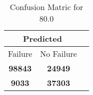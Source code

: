 \begin{table}[] 
\label{Table: Prediction Accuracy-DMD80.0OnlySunEKF-combinationReflection-Reflection} 
\caption{Confusion Matric for 80.0} 
\centering 
\begin{tabular} 
 {@{}ccc@{}} 
\toprule 
\multicolumn{2}{c}{\textbf{Predicted}}
 \\ \midrule 
\multicolumn{1}{|c|}{Failure} & 
\multicolumn{1}{c|}{No Failure}
 \\ \midrule 
\multicolumn{1}{|c|}{\color{green}\textbf{98843}} & 
\multicolumn{1}{c|}{\color{red}\textbf{24949}}
 \\ \midrule 
\multicolumn{1}{|c|}{\color{red}\textbf{9033}} & 
\multicolumn{1}{c|}{\color{green}\textbf{37303}}
 \\ \bottomrule 
\end{tabular} 
\end{table} 
